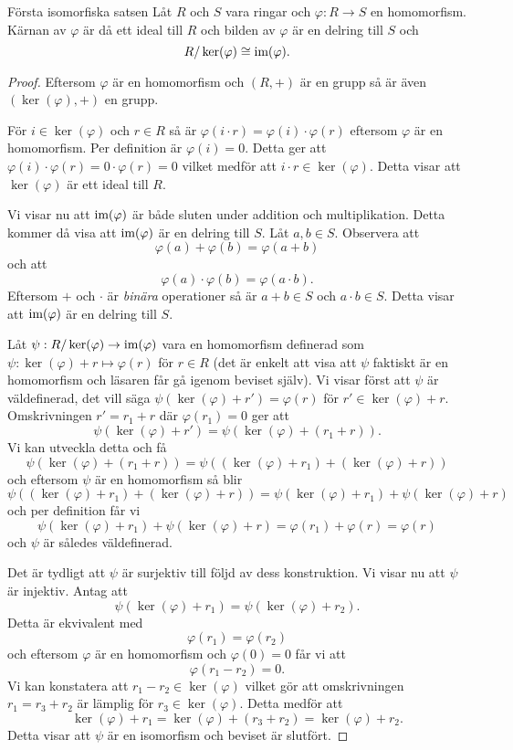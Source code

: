 \documentclass{article}
\newcommand{\im}[0]{\textnormal{im}}
\theoremstyle{definition}
\begin{document}
\hypertarget{isomorfiska}{}
\begin{mytheo}{Första isomorfiska satsen}{}
  Låt $R$ och $S$ vara ringar och $\varphi: R \rightarrow S$ en homomorfism. Kärnan av $\varphi$ är då ett ideal till $R$ och bilden av $\varphi$ är en 
  delring till $S$ och 
  \[R/ \ker(\varphi) \cong \im(\varphi).\]
\end{mytheo}
\begin{proof}
  Eftersom $\varphi$ är en homomorfism och $(R, +)$ är en grupp så är även $(\ker(\varphi), +)$ en grupp. 

  För $i \in \ker(\varphi)$ och $r \in R$ så är $\varphi(i \cdot r) = \varphi(i) \cdot \varphi(r)$ eftersom $\varphi$ är en homomorfism. 
  Per definition är $\varphi(i) = 0$. Detta ger att $\varphi(i) \cdot \varphi(r) = 0 \cdot \varphi(r) = 0$ vilket medför att $i \cdot r \in \ker(\varphi)$.
  Detta visar att $\ker(\varphi)$ är ett ideal till $R$.

  Vi visar nu att $\im(\varphi)$ är både sluten under addition och multiplikation. Detta kommer då visa att $\im(\varphi)$ är en delring till $S$.
  Låt $a, b \in S$. Observera att 
  \[\varphi(a) + \varphi(b) = \varphi(a + b)\]
  och att 
  \[\varphi(a) \cdot \varphi(b) = \varphi(a \cdot b).\]
  Eftersom $+$ och $\cdot$ är \textit{binära} operationer så är $a + b \in S$ och $a \cdot b \in S$. Detta visar att $\im(\varphi)$ är en delring till $S$.

  Låt $\psi: R/ \ker(\varphi) \rightarrow \im(\varphi)$ vara en homomorfism definerad som $\psi: \ker(\varphi) + r \mapsto \varphi(r)$ för $r \in R$ 
  (det är enkelt att visa att $\psi$ faktiskt är en homomorfism och läsaren får gå igenom beviset själv). Vi visar först 
  att $\psi$ är väldefinerad, det vill säga $\psi(\ker(\varphi) + r') = \varphi(r)$ för $r' \in \ker(\varphi) + r.$ Omskrivningen 
  $r' = r_1 + r$ där $\varphi(r_1) = 0$ ger att 
  \[\psi(\ker(\varphi) + r') = \psi(\ker(\varphi) + (r_1+r)).\]
  Vi kan utveckla detta och få
  \[\psi(\ker(\varphi) + (r_1+r)) = \psi((\ker(\varphi) + r_1) + (\ker(\varphi) + r))\]
  och eftersom $\psi$ är en homomorfism så blir 
  \[\psi((\ker(\varphi) + r_1) + (\ker(\varphi) + r)) = \psi(\ker(\varphi) + r_1) + \psi(\ker(\varphi) + r)\]
  och per definition får vi
  \[\psi(\ker(\varphi) + r_1) + \psi(\ker(\varphi) + r) = \varphi(r_1) + \varphi(r) = \varphi(r)\]
  och $\psi$ är således väldefinerad.

  Det är tydligt att $\psi$ är surjektiv till följd av dess konstruktion. Vi visar nu att $\psi$ är injektiv. Antag att 
  \[\psi(\ker(\varphi) + r_1) = \psi(\ker(\varphi) + r_2).\]
  Detta är ekvivalent med 
  \[\varphi(r_1) = \varphi(r_2)\]
  och eftersom $\varphi$ är en homomorfism och $\varphi(0) = 0$ får vi att 
  \[\varphi(r_1 - r_2) = 0.\]
  Vi kan konstatera att $r_1 - r_2 \in \ker(\varphi)$ vilket gör att omskrivningen $r_1 = r_3 + r_2$ är lämplig för $r_3 \in \ker(\varphi)$.
  Detta medför att 
  \[\ker(\varphi) + r_1 = \ker(\varphi) + (r_3 + r_2) = \ker(\varphi) + r_2.\]
  Detta visar att $\psi$ är en isomorfism och beviset är slutfört.
\end{proof}
\end{document}
